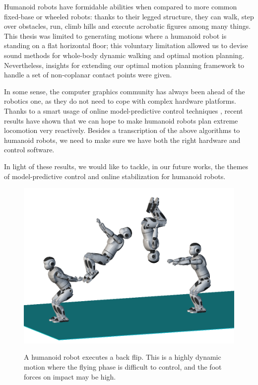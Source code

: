 Humanoid robots have formidable abilities when compared to more common
fixed-base or wheeled robots: thanks to their legged structure, they
can walk, step over obstacles, run, climb hills and execute acrobatic
figures among many things. This thesis was limited to generating
motions where a humanoid robot is standing on a flat horizontal floor;
this voluntary limitation allowed us to devise sound methods for
whole-body dynamic walking and optimal motion planning. Nevertheless,
insights for extending our optimal motion planning framework to handle
a set of non-coplanar contact points were given.

In some sense, the computer graphics community has always been ahead
of the robotics one, as they do not need to cope with complex hardware
platforms. Thanks to a smart usage of online model-predictive control
techniques \cite{coros2010generalized,tassa2012synthesis}, recent
results have shown that we can hope to make humanoid robots plan
extreme locomotion very reactively. Besides a transcription of the
above algorithms to humanoid robots, we need to make sure we have both
the right hardware and control software.

\bigskip

In light of these results, we would like to tackle, in our future
works, the themes of model-predictive control and online stabilization
for humanoid robots.

\bigskip

\begin{figure}
  \centering
      {\includegraphics[width = 0.8\linewidth]
        {src/chap4-conclusion/romeo-back-flip.png}}
      \caption{A humanoid robot executes a back flip. This is a highly
        dynamic motion where the flying phase is difficult to control,
        and the foot forces on impact may be high.}
      \label{fig:chap4-romeo-back-flip}
\end{figure}

